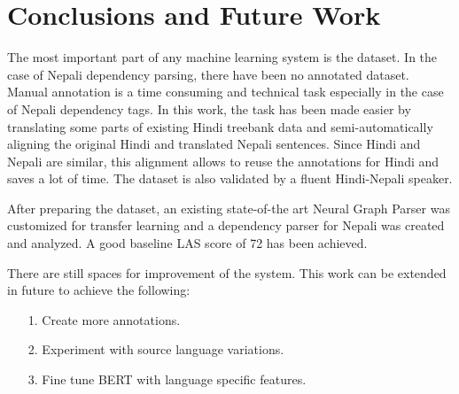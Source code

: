\section{Conclusions and Future Work}
The most important part of any machine learning system is the dataset.
In the case of Nepali dependency parsing, there have been no annotated
dataset. Manual annotation is a time consuming and technical task
especially in the case of Nepali dependency tags. In this work, the
task has been made easier by translating some parts of existing Hindi
treebank data and semi-automatically aligning the original Hindi and
translated Nepali sentences. Since Hindi and Nepali are similar, this
alignment allows to reuse the annotations for Hindi and saves a lot of
time. The dataset is also validated by a fluent Hindi-Nepali speaker.

After preparing the dataset, an existing state-of-the art Neural
Graph Parser was customized for transfer learning and a dependency
parser for Nepali was created and analyzed. A good baseline LAS score
of 72 has been achieved.

There are still spaces for improvement of the system. This work can be
extended in future to achieve the following:
\begin{itemize}
    \item [1.] Create more annotations.
    \item [2.] Experiment with source language variations.
    \item [3.] Fine tune BERT with language specific features.
\end{itemize}
